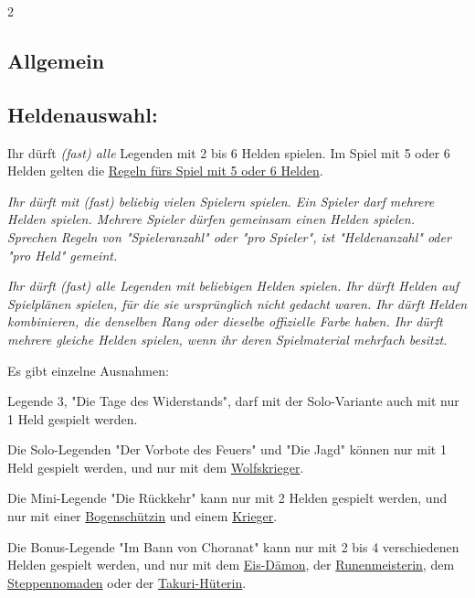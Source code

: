 \documentclass[10pt, a4paper, oneside]{book}
\newcommand{\fan}[1]{\textit{#1}}
\begin{document}
\begin{multicols*}{2}\raggedcolumns




\begin{nobgcolor}

\section{Allgemein}





\subsection{Heldenauswahl:}

Ihr dürft \fan{(fast) alle} Legenden mit 2 bis 6 Helden spielen. Im Spiel mit 5 oder 6 Helden gelten die \hyperref[5-oder-6-helden]{Regeln fürs Spiel mit 5 oder 6 Helden}.

\fan{Ihr dürft mit (fast) beliebig vielen Spielern spielen. Ein Spieler darf mehrere Helden spielen. Mehrere Spieler dürfen gemeinsam einen Helden spielen. Sprechen Regeln von "Spieleranzahl" oder "pro Spieler", ist "Heldenanzahl" oder "pro Held" gemeint.}

\fan{Ihr dürft (fast) alle Legenden mit beliebigen Helden spielen. Ihr dürft Helden auf Spielplänen spielen, für die sie ursprünglich nicht gedacht waren. Ihr dürft Helden kombinieren, die denselben Rang oder dieselbe offizielle Farbe haben. Ihr dürft mehrere gleiche Helden spielen, wenn ihr deren Spielmaterial mehrfach besitzt.}



Es gibt einzelne Ausnahmen:

\bullet{} Legende 3, "Die Tage des Widerstands", darf mit der Solo-Variante auch mit nur 1 Held gespielt werden.

\bullet{} Die Solo-Legenden "Der Vorbote des Feuers" und "Die Jagd" können nur mit 1 Held gespielt werden, und nur mit dem \hyperref[wolfskrieger]{Wolfskrieger}.

\bullet{} Die Mini-Legende "Die Rückkehr" kann nur mit 2 Helden gespielt werden, und nur mit einer \hyperref[bogenschuetzin]{Bogenschützin} und einem \hyperref[krieger]{Krieger}.

\bullet{} Die Bonus-Legende "Im Bann von Choranat" kann nur mit 2 bis 4 verschiedenen Helden gespielt werden, und nur mit dem \hyperref[eis-daemon]{Eis-Dämon}, der \hyperref[runenmeisterin]{Runenmeisterin}, dem \hyperref[steppennomade]{Steppennomaden} oder der \hyperref[takuri-hueterin]{Takuri-Hüterin}.


\end{nobgcolor}
\end{multicols*}
\end{document}

